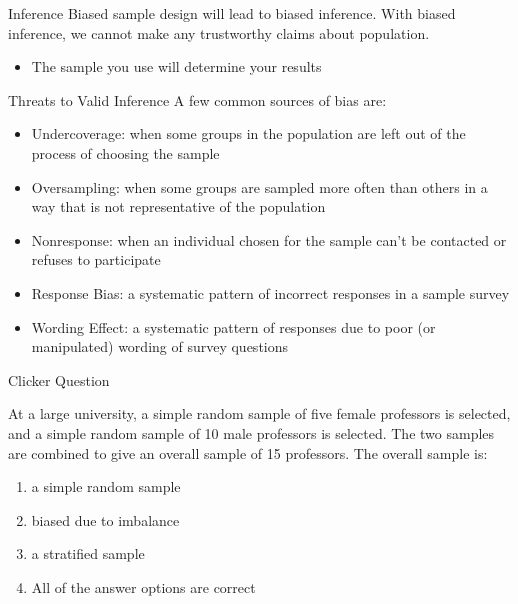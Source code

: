 \documentclass{beamer}
\begin{document}
\begin{frame}{Inference}
	Biased sample design will lead to biased inference. With biased inference, we cannot make any trustworthy claims about population.
	\begin{itemize}
		\item The sample you use will determine your results
	\end{itemize}
\end{frame}

\begin{frame}{Threats to Valid Inference}
	A few common sources of bias are:
	\begin{itemize}
		\item \alert{Undercoverage}: when some groups in the population are left out of the process of choosing the sample
		\item \alert{Oversampling}: when some groups are sampled more often than others in a way that is not representative of the population
		\item \alert{Nonresponse}: when an individual chosen for the sample can't be contacted or refuses to participate
		\item \alert{Response Bias}: a systematic pattern of incorrect responses in a sample survey
		\item \alert{Wording Effect}: a systematic pattern of responses due to poor (or manipulated) wording of survey questions
	\end{itemize}
\end{frame}



\begin{frame}{Clicker Question}
	
	At a large university, a simple random sample of five female professors is selected, and a simple random sample of 10 male professors is selected. The two samples are combined to give an overall sample of 15 professors. The overall sample is:
	\begin{enumerate}[label=(\alph*)]
		\item a simple random sample
		\item biased due to imbalance
		\item a stratified sample
		\item All of the answer options are correct
	\end{enumerate}
	
\end{frame}
\end{document}
